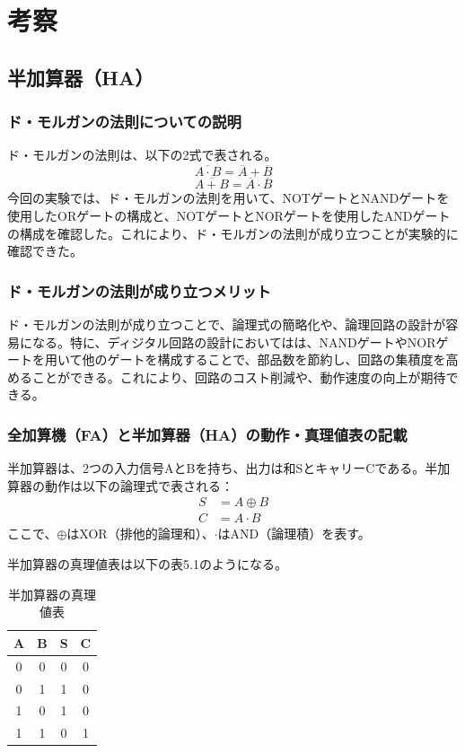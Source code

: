 \documentclass{jlreq}
\numberwithin{equation}{section}
\begin{document}
\section{考察}

\subsection{半加算器（HA）}
\subsubsection{ド・モルガンの法則についての説明}
ド・モルガンの法則は、以下の2式で表される。
\begin{equation}
  \overline{A \cdot B} = \overline{A} + \overline{B}
\end{equation}
\begin{equation}
  \overline{A + B} = \overline{A} \cdot \overline{B}
\end{equation}
今回の実験では、ド・モルガンの法則を用いて、NOTゲートとNANDゲートを使用したORゲートの構成と、NOTゲートとNORゲートを使用したANDゲートの構成を確認した。これにより、ド・モルガンの法則が成り立つことが実験的に確認できた。

\subsubsection{ド・モルガンの法則が成り立つメリット}
ド・モルガンの法則が成り立つことで、論理式の簡略化や、論理回路の設計が容易になる。特に、ディジタル回路の設計においてはは、NANDゲートやNORゲートを用いて他のゲートを構成することで、部品数を節約し、回路の集積度を高めることができる。これにより、回路のコスト削減や、動作速度の向上が期待できる。

\subsubsection{全加算機（FA）と半加算器（HA）の動作・真理値表の記載}
半加算器は、2つの入力信号AとBを持ち、出力は和SとキャリーCである。半加算器の動作は以下の論理式で表される：
\begin{align}
  S &= A \oplus B \\
  C &= A \cdot B
\end{align}
ここで、\(\oplus\)はXOR（排他的論理和）、\(\cdot\)はAND（論理積）を表す。

半加算器の真理値表は以下の表5.1のようになる。
\begin{table}[H]
  \centering
  \caption{半加算器の真理値表}
  \begin{tabular}{|c|c|c|c|}
    \hline
    A & B & S & C \\ \hline
    0 & 0 & 0 & 0 \\ \hline
    0 & 1 & 1 & 0 \\ \hline
    1 & 0 & 1 & 0 \\ \hline
    1 & 1 & 0 & 1 \\ \hline
  \end{tabular}
\end{table}
\end{document}
